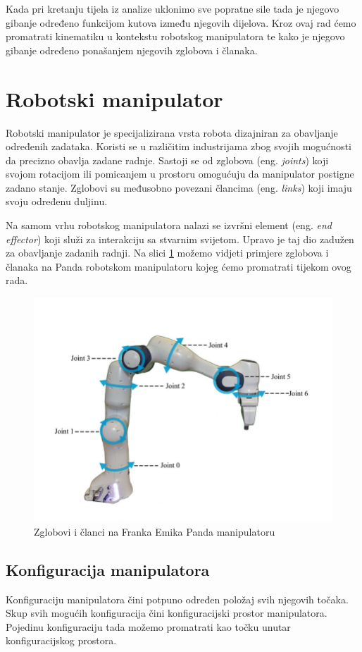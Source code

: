 \documentclass[times, utf8, diplomskirad]{fer}
\begin{document}
Kada pri kretanju tijela iz analize uklonimo sve popratne sile tada je njegovo gibanje određeno funkcijom kutova između njegovih dijelova.
Kroz ovaj rad ćemo promatrati kinematiku u kontekstu robotskog manipulatora te kako je njegovo gibanje određeno ponašanjem njegovih zglobova i članaka.

\section{Robotski manipulator}
Robotski manipulator je specijalizirana vrsta robota dizajniran za obavljanje određenih zadataka.
Koristi se u različitim industrijama zbog svojih mogućnosti da precizno obavlja zadane radnje.
Sastoji se od zglobova (eng. \textit{joints}) koji svojom rotacijom ili pomicanjem u prostoru omogućuju da manipulator postigne zadano stanje.
Zglobovi su međusobno povezani člancima (eng. \textit{links}) koji imaju svoju određenu duljinu.

Na samom vrhu robotskog manipulatora nalazi se izvršni element (eng. \textit{end effector}) koji služi za interakciju sa stvarnim svijetom.
Upravo je taj dio zadužen za obavljanje zadanih radnji.
Na slici \ref{fig:panda-zglob} možemo vidjeti primjere zglobova i članaka na Panda robotskom manipulatoru kojeg ćemo promatrati tijekom ovog rada.
\begin{figure}[H]
    \centering
    \includegraphics[width=12cm]{img/panda-links-and-joints}
    \caption{Zglobovi i članci na Franka Emika Panda manipulatoru\protect\footnotemark}
    \label{fig:panda-zglob}
\end{figure}

\subsection{Konfiguracija manipulatora}
Konfiguraciju manipulatora čini potpuno određen položaj svih njegovih točaka.
Skup svih mogućih konfiguracija čini konfiguracijski prostor manipulatora.
Pojedinu konfiguraciju tada možemo promatrati kao točku unutar konfiguracijskog prostora.
\end{document}
